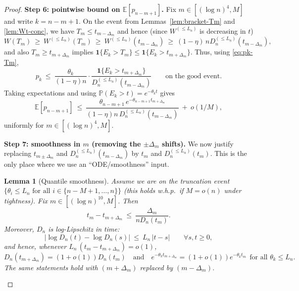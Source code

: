 \documentclass[10pt]{article}
\newtheorem{lem}[thm]{Lemma}
\numberwithin{equation}{section}
\begin{document}
\begin{proof}
\textbf{Step 6: pointwise bound on $\mathbb E[p_{n-m+1}]$.}
Fix $m\in[(\log n)^4,M]$ and write $k=n-m+1$. On the event from Lemmas~\ref{lem:bracket-Tm} and \ref{lem:Wt-conc},
we have $T_m\le t_{m-\Delta_m}$ and hence (since $W^{(\le L_n)}$ is decreasing in $t$)
\[
W(T_m)\ \ge\ W^{(\le L_n)}(T_m)\ \ge\ W^{(\le L_n)}(t_{m-\Delta_m})
\ \ge\ (1-\eta)\,nD_n^{(\le L_n)}(t_{m-\Delta_m}),
\]
and also $T_m\ge t_{m+\Delta_m}$ implies $\mathbf 1\{E_k>T_m\}\le \mathbf 1\{E_k>t_{m+\Delta_m}\}$.
Thus, using \eqref{eq:pk-Tm},
\begin{equation}\label{eq:pk-bound-shifted}
p_k \ \le\ \frac{\theta_k}{(1-\eta)n}\cdot
\frac{\mathbf 1\{E_k>t_{m+\Delta_m}\}}{D_n^{(\le L_n)}(t_{m-\Delta_m})}
\qquad\text{on the good event.}
\end{equation}
Taking expectations and using $\mathbb P(E_k>t)=e^{-\theta_k t}$ gives
\begin{equation}\label{eq:Epk-bound-shifted}
\mathbb E[p_{n-m+1}]
\ \le\ \frac{\theta_{n-m+1}\,e^{-\theta_{n-m+1}t_{m+\Delta_m}}}{(1-\eta)n\,D_n^{(\le L_n)}(t_{m-\Delta_m})}
\ +\ o(1/M),
\end{equation}
uniformly for $m\in[(\log n)^4,M]$.

\textbf{Step 7: smoothness in $m$ (removing the $\pm\Delta_m$ shifts).}
We now justify replacing $t_{m\pm\Delta_m}$ and $D_n^{(\le L_n)}(t_{m-\Delta_m})$ by $t_m$ and $D_n^{(\le L_n)}(t_m)$.
This is the only place where we use an ``ODE/smoothness'' input.

\begin{lem}[Quantile smoothness]\label{lem:smoothness}
Assume we are on the truncation event $\{\theta_i\le L_n \text{ for all } i\in\{n-M+1,\dots,n\}\}$ (this holds w.h.p.\ if $M=o(n)$ under tightness).
Fix $m\in[(\log n)^{10},M]$. Then
\begin{equation}\label{eq:tm-smooth}
t_m-t_{m+\Delta_m}\ \le\ \frac{\Delta_m}{nD_n(t_m)}.
\end{equation}
Moreover, $D_n$ is log-Lipschitz in time:
\begin{equation}\label{eq:Dn-loglip}
\bigl|\log D_n(t)-\log D_n(s)\bigr|\ \le\ L_n\,|t-s|\qquad\forall s,t\ge0,
\end{equation}
and hence, whenever $L_n\,(t_m-t_{m+\Delta_m})=o(1)$,
\begin{equation}\label{eq:Dn-smooth}
D_n(t_{m+\Delta_m})=(1+o(1))D_n(t_m)
\quad\text{and}\quad
e^{-\theta_k t_{m+\Delta_m}}=(1+o(1))e^{-\theta_k t_m}
\ \ \text{for all }\theta_k\le L_n.
\end{equation}
The same statements hold with $(m+\Delta_m)$ replaced by $(m-\Delta_m)$.
\end{lem}


\end{proof}
\end{document}
